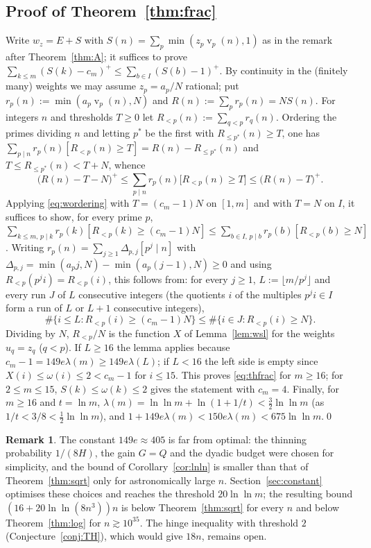 \documentclass[11pt]{article}
\theoremstyle{definition}
\newtheorem{remark}[theorem]{Remark}
\DeclareMathOperator{\vp}{v}
\begin{document}
\subsection*{Proof of Theorem~\ref{thm:frac}}
Write $w_z=E+S$ with $S(n)=\sum_p\min(z_p\vp_p(n),1)$ as in the remark after Theorem~\ref{thm:A}; it suffices to prove
$\sum_{k\le m}(S(k)-c_m)^+\le\sum_{b\in I}(S(b)-1)^+$. By continuity in the (finitely many) weights we may assume $z_p=a_p/N$
rational; put $r_p(n):=\min(a_p\vp_p(n),N)$ and $R(n):=\sum_pr_p(n)=NS(n)$. For integers $n$ and thresholds $T\ge0$ let
$R_{<p}(n):=\sum_{q<p}r_q(n)$. Ordering the primes dividing $n$ and letting $p^*$ be the first with $R_{\le p^*}(n)\ge T$,
one has $\sum_{p\mid n}r_p(n)[R_{<p}(n)\ge T]=R(n)-R_{\le p^*}(n)$ and $T\le R_{\le p^*}(n)<T+N$, whence
\begin{equation}\label{eq:wordering}
\bigl(R(n)-T-N\bigr)^+\le\sum_{p\mid n}r_p(n)\bigl[R_{<p}(n)\ge T\bigr]\le\bigl(R(n)-T\bigr)^+ .
\end{equation}
Applying \eqref{eq:wordering} with $T=(c_m-1)N$ on $[1,m]$ and with $T=N$ on $I$, it suffices to show, for every prime $p$,
$\sum_{k\le m,\,p\mid k}r_p(k)[R_{<p}(k)\ge(c_m-1)N]\le\sum_{b\in I,\,p\mid b}r_p(b)[R_{<p}(b)\ge N]$. Writing
$r_p(n)=\sum_{j\ge1}\Delta_{p,j}[p^j\mid n]$ with $\Delta_{p,j}=\min(a_pj,N)-\min(a_p(j-1),N)\ge0$ and using
$R_{<p}(p^ji)=R_{<p}(i)$, this follows from: for every $j\ge1$, $L:=\lfloor m/p^j\rfloor$ and every run $J$ of $L$ consecutive
integers (the quotients $i$ of the multiples $p^ji\in I$ form a run of $L$ or $L+1$ consecutive integers),
\[
\#\{i\le L:R_{<p}(i)\ge(c_m-1)N\}\le\#\{i\in J:R_{<p}(i)\ge N\}.
\]
Dividing by $N$, $R_{<p}/N$ is the function $X$ of Lemma~\ref{lem:wsl} for the weights $u_q=z_q$ ($q<p$). If $L\ge16$ the
lemma applies because $c_m-1=149e\lambda(m)\ge149e\lambda(L)$; if $L<16$ the left side is empty since $X(i)\le\omega(i)\le2<c_m-1$
for $i\le15$. This proves \eqref{eq:thfrac} for $m\ge16$; for $2\le m\le15$, $S(k)\le\omega(k)\le2$ gives the statement with $c_m=4$.
Finally, for $m\ge16$ and $t=\ln m$, $\lambda(m)=\ln\ln m+\ln(1+1/t)<\tfrac32\ln\ln m$ (as $1/t<3/8<\tfrac12\ln\ln m$), and
$1+149e\lambda(m)<150e\lambda(m)<675\ln\ln m$.\qed

\begin{remark}
The constant $149e\approx405$ is far from optimal: the thinning probability $1/(8H)$, the gain $G=Q$ and the dyadic budget
were chosen for simplicity, and the bound of Corollary~\ref{cor:lnln} is smaller than that of Theorem~\ref{thm:sqrt} only for
astronomically large $n$. Section~\ref{sec:constant} optimises these choices and reaches the threshold $20\ln\ln m$; the resulting
bound $(16+20\ln\ln(8n^3))n$ is below Theorem~\ref{thm:sqrt} for every $n$ and below Theorem~\ref{thm:log} for $n\gtrsim10^{35}$. The hinge inequality with threshold $2$ (Conjecture~\ref{conj:TH}),
which would give $18n$, remains open.
\end{remark}
\end{document}
